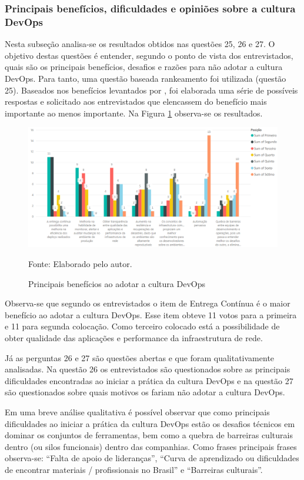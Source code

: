 \documentclass[twoside,english,brazilian]{UNISINOSartigo}
\newcommand{\source}[1]{\caption*{Fonte: {#1}} }
\begin{document}
\subsubsection{Principais benefícios, dificuldades e opiniões sobre a cultura DevOps}
Nesta subseção analisa-se os resultados obtidos nas questões 25, 26 e 27. O objetivo destas questões é entender, segundo o ponto de vista dos entrevistados, quais são os principais benefícios, desafios e razões para não adotar a cultura DevOps. Para tanto,  uma questão baseada rankeamento foi utilizada  (questão 25). Baseados nos benefícios levantados por , foi elaborada uma série de possíveis respostas e solicitado aos entrevistados que elencassem do benefício mais importante ao menos importante. Na Figura \ref{fig:AnaliseRanking} observa-se os resultados.
\begin{figure}[!ht]
    \centering
    \caption{Principais benefícios ao adotar a cultura DevOps}
       \includegraphics[scale=.6]{imagens/questao25.png}
        \source{Elaborado pelo autor.}
        \label{fig:AnaliseRanking}
\end{figure}
 Observa-se que segundo os entrevistados o item de Entrega Contínua é o maior benefício ao adotar a cultura DevOps. Esse item obteve 11 votos para a primeira e 11 para segunda colocação. Como terceiro colocado está a possibilidade de obter qualidade das aplicações e performance da infraestrutura de rede.
 
Já as perguntas 26 e 27 são questões abertas e que foram qualitativamente analisadas. Na questão 26 os entrevistados são questionados sobre as principais dificuldades encontradas ao iniciar a prática da cultura DevOps e na questão 27 são questionados sobre quais motivos os fariam não adotar a cultura DevOps.

Em uma breve análise qualitativa é possível observar que como principais dificuldades ao iniciar a prática da cultura DevOps estão os desafios técnicos em dominar os conjuntos de ferramentas, bem como a quebra de barreiras culturais dentro (ou silos funcionais) dentro das companhias. Como frases principais frases observa-se: ``Falta de apoio de lideranças'', ``Curva de aprendizado ou dificuldades de encontrar materiais / profissionais no Brasil'' e ``Barreiras culturais''. 
\end{document}
